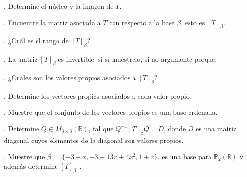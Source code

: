 \documentclass[letterpaper]{article}
\renewcommand{\*}{\cdot}
\theoremstyle{definition}
\begin{document}
. Determine el núcleo y la imagen de $T$.

. Encuentre la matriz asociada a $T$ con respecto a la base $\beta$, esto es $[T]_{\beta}$.

. ¿Cuál es el rango de $[T]_{\beta}$?

. La matriz $[T]_{\beta}$ es invertible, si sí muéstrelo, si no argumente porque.

. ¿Cuales son los valores propios asociados a $[T]_{\beta}$?

. Determine los vectores propios asociados a cada valor propio. 

. Muestre que el conjunto de los vectores propios es una base ordenada.

. Determine $Q \in M_{3\times 3}(\mathbb{R})$, tal que $Q^{-1}[T]_{\beta} Q = D$, donde $D$ es una matriz diagonal cuyos elementos de la diagonal son valores propios.

. Muestre que $\beta^{'} =\{ -3+x , -3-13x + 4x^2, 1+x \}$, es una base para $ \mathbb{P}_{2}(\mathbb{R})$ y además determine $[T]_{\beta^{'}}$ .
\end{document}
